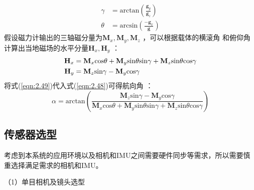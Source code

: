 \begin{equation}
\label{eqn:2.48}
\begin{aligned}
\gamma &= \text{arctan}\left(\frac{\mathbf{g}_y}{\mathbf{g}_z}\right) \\
\theta &= \text{arcsin}\left( \frac{-\mathbf{g}_x}{\mathbf{g}}\right)
\end{aligned}
\end{equation}
假设磁力计输出的三轴磁分量为$\mathbf{M}_x,\mathbf{M}_y,\mathbf{M}_z $ ，可以根据载体的横滚角 和俯仰角 计算出当地磁场的水平分量$\mathbf{H}_x, \mathbf{H}_y $ ：
\begin{equation}
\label{eqn:2.49}
\setlength{\abovedisplayskip}{6pt}
\setlength{\belowdisplayskip}{6pt}
\begin{aligned}
\mathbf{H}_x &= \mathbf{M}_x \text{cos}\theta + \mathbf{M}_y\text{sin}\theta\text{sin}\gamma + \mathbf{M}_z \text{sin}\theta\text{cos}\gamma \\
\mathbf{H}_y &= \mathbf{M}_z\text{sin}\gamma  - \mathbf{M}_y \text{cos}\gamma
\end{aligned}
\end{equation}
将式(\ref{eqn:2.49})代入式(\ref{eqn:2.48})可得航向角 ：
\begin{equation}
\label{eqn:2.50}
\alpha = \text{arctan}\left(
\frac{\mathbf{M}_z\text{sin}\gamma  - \mathbf{M}_y \text{cos}\gamma}
{\mathbf{M}_x \text{cos}\theta + \mathbf{M}_y\text{sin}\theta\text{sin}\gamma + \mathbf{M}_z \text{sin}\theta\text{cos}\gamma }\right)
\end{equation}
\subsection{传感器选型}
考虑到本系统的应用环境以及相机和IMU之间需要硬件同步等需求，所以需要慎重选择满足需求的相机和IMU。

（1）单目相机及镜头选型

